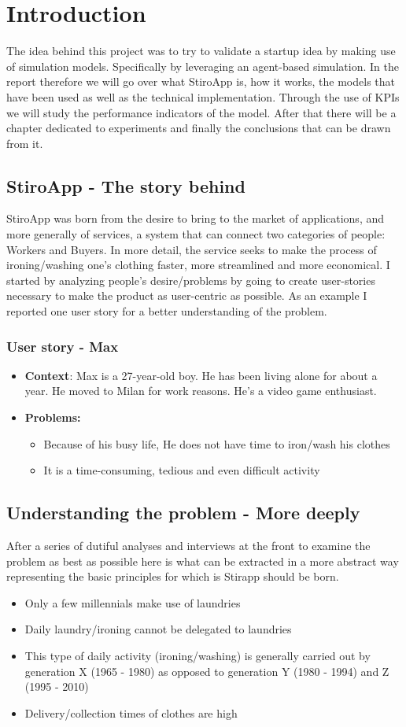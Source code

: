 \chapter{Introduction}
The idea behind this project was to try to validate a startup idea by making use of simulation models. Specifically by leveraging an agent-based simulation.
In the report therefore we will go over what StiroApp is, how it works, the models that have been used as well as the technical implementation. Through the use of KPIs we will study the performance indicators of the model. After that there will be a chapter dedicated to experiments and finally the conclusions that can be drawn from it.

\section{StiroApp - The story behind}
StiroApp was born from the desire to bring to the market of applications, and more generally of services, a system that can connect two categories of people: Workers and Buyers. In more detail, the service seeks to make the process of ironing/washing one's clothing faster, more streamlined and more economical. I started by analyzing people's desire/problems by going to create user-stories necessary to make the product as user-centric as possible. As an example I reported one user story for a better understanding of the problem.
\subsection{User story - Max}
\begin{itemize}
\item \textbf{Context}: Max is a 27-year-old boy. He has been living alone for about a year. He moved to Milan for work reasons. He's a video game enthusiast.
\item \textbf{Problems:} 
	\begin{itemize}
		\item Because of his busy life, He does not have time to iron/wash his clothes
		\item It is a time-consuming, tedious and even difficult activity
	\end{itemize}
\end{itemize}
\section{Understanding the problem - More deeply}
After a series of dutiful analyses and interviews at the front to examine the problem as best as possible here is what can be extracted in a more abstract way representing the basic principles for which is Stirapp should be born.
\begin{itemize}
\item Only a few millennials make use of laundries
\item Daily laundry/ironing cannot be delegated to laundries
\item This type of daily activity (ironing/washing) is generally carried out by generation X (1965 - 1980) as opposed to generation Y (1980 - 1994) and Z (1995 - 2010)
\item Delivery/collection times of clothes are high
\end{itemize}
